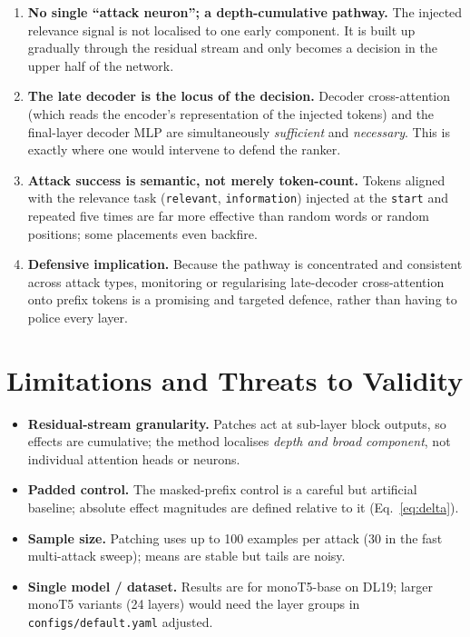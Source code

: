 \documentclass[11pt]{article}
\begin{document}
\begin{enumerate}
  \item \textbf{No single ``attack neuron''; a depth-cumulative pathway.} The
        injected relevance signal is not localised to one early component. It is
        built up gradually through the residual stream and only becomes a
        decision in the upper half of the network.
  \item \textbf{The late decoder is the locus of the decision.} Decoder
        cross-attention (which reads the encoder's representation of the injected
        tokens) and the final-layer decoder MLP are simultaneously
        \emph{sufficient} and \emph{necessary}. This is exactly where one would
        intervene to defend the ranker.
  \item \textbf{Attack success is semantic, not merely token-count.} Tokens
        aligned with the relevance task (\texttt{relevant}, \texttt{information})
        injected at the \texttt{start} and repeated five times are far more
        effective than random words or random positions; some placements even
        backfire.
  \item \textbf{Defensive implication.} Because the pathway is concentrated and
        consistent across attack types, monitoring or regularising late-decoder
        cross-attention onto prefix tokens is a promising and targeted defence,
        rather than having to police every layer.
\end{enumerate}

\section{Limitations and Threats to Validity}

\begin{itemize}
  \item \textbf{Residual-stream granularity.} Patches act at sub-layer block
        outputs, so effects are cumulative; the method localises \emph{depth and
        broad component}, not individual attention heads or neurons.
  \item \textbf{Padded control.} The masked-prefix control is a careful but
        artificial baseline; absolute effect magnitudes are defined relative to
        it (Eq.~\ref{eq:delta}).
  \item \textbf{Sample size.} Patching uses up to 100 examples per attack (30 in
        the fast multi-attack sweep); means are stable but tails are noisy.
  \item \textbf{Single model / dataset.} Results are for monoT5-base on DL19;
        larger monoT5 variants (24 layers) would need the layer groups in
        \texttt{configs/default.yaml} adjusted.
\end{itemize}
\end{document}

